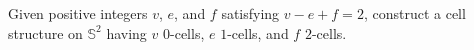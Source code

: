 \setcounter{question}{13}
\question Given positive integers $v$, $e$, and $f$ satisfying $v-e+f=2$,
construct a cell structure on $\mathbb{S}^2$ having $v$ $0$-cells, $e$
$1$-cells, and $f$ $2$-cells.